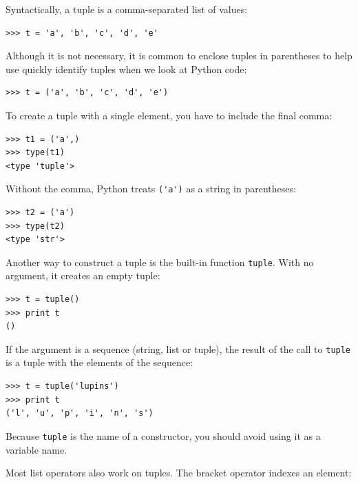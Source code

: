 \documentclass[10pt]{book}
\begin{document}

Syntactically, a tuple is a comma-separated list of values:

\beforeverb
\begin{verbatim}
>>> t = 'a', 'b', 'c', 'd', 'e'
\end{verbatim}
\afterverb
%
Although it is not necessary, it is common to enclose tuples in
parentheses to help use quickly identify tuples when we look at
Python code:


\beforeverb
\begin{verbatim}
>>> t = ('a', 'b', 'c', 'd', 'e')
\end{verbatim}
\afterverb
%
To create a tuple with a single element, you have to include the final
comma:


\beforeverb
\begin{verbatim}
>>> t1 = ('a',)
>>> type(t1)
<type 'tuple'>
\end{verbatim}
\afterverb
%
Without the comma, Python treats \verb"('a')" as a string in
parentheses:

\beforeverb
\begin{verbatim}
>>> t2 = ('a')
>>> type(t2)
<type 'str'>
\end{verbatim}
\afterverb
%
Another way to construct a tuple is the built-in function {\tt tuple}.
With no argument, it creates an empty tuple:


\beforeverb
\begin{verbatim}
>>> t = tuple()
>>> print t
()
\end{verbatim}
\afterverb
%
If the argument is a sequence (string, list or tuple), the result
of the call to {\tt tuple}
is a tuple with the elements of the sequence:

\beforeverb
\begin{verbatim}
>>> t = tuple('lupins')
>>> print t
('l', 'u', 'p', 'i', 'n', 's')
\end{verbatim}
\afterverb
%
Because {\tt tuple} is the name of a constructor, you should
avoid using it as a variable name.

Most list operators also work on tuples.  The bracket operator
indexes an element:

\end{document}
